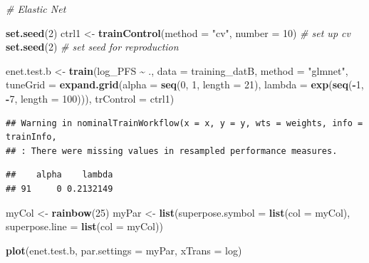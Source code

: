 \documentclass[
]{article}
\newenvironment{Shaded}{\begin{snugshade}}{\end{snugshade}}
\newcommand{\AttributeTok}[1]{\textcolor[rgb]{0.13,0.29,0.53}{#1}}
\newcommand{\CommentTok}[1]{\textcolor[rgb]{0.56,0.35,0.01}{\textit{#1}}}
\newcommand{\DecValTok}[1]{\textcolor[rgb]{0.00,0.00,0.81}{#1}}
\newcommand{\FunctionTok}[1]{\textcolor[rgb]{0.13,0.29,0.53}{\textbf{#1}}}
\newcommand{\NormalTok}[1]{#1}
\newcommand{\OtherTok}[1]{\textcolor[rgb]{0.56,0.35,0.01}{#1}}
\newcommand{\SpecialCharTok}[1]{\textcolor[rgb]{0.81,0.36,0.00}{\textbf{#1}}}
\newcommand{\StringTok}[1]{\textcolor[rgb]{0.31,0.60,0.02}{#1}}
\begin{document}
\begin{Shaded}
\begin{Highlighting}[]
\CommentTok{\# Elastic Net}

\FunctionTok{set.seed}\NormalTok{(}\DecValTok{2}\NormalTok{)}
\NormalTok{ctrl1 }\OtherTok{\textless{}{-}} \FunctionTok{trainControl}\NormalTok{(}\AttributeTok{method =} \StringTok{"cv"}\NormalTok{, }\AttributeTok{number =} \DecValTok{10}\NormalTok{) }\CommentTok{\# set up cv}
\FunctionTok{set.seed}\NormalTok{(}\DecValTok{2}\NormalTok{) }\CommentTok{\# set seed for reproduction}

\NormalTok{enet.test.b }\OtherTok{\textless{}{-}} \FunctionTok{train}\NormalTok{(log\_PFS }\SpecialCharTok{\textasciitilde{}}\NormalTok{ ., }
                  \AttributeTok{data =}\NormalTok{ training\_datB, }
                  \AttributeTok{method =} \StringTok{"glmnet"}\NormalTok{,}
                  \AttributeTok{tuneGrid =} \FunctionTok{expand.grid}\NormalTok{(}\AttributeTok{alpha =} \FunctionTok{seq}\NormalTok{(}\DecValTok{0}\NormalTok{, }\DecValTok{1}\NormalTok{, }\AttributeTok{length =} \DecValTok{21}\NormalTok{),}
                                         \AttributeTok{lambda =} \FunctionTok{exp}\NormalTok{(}\FunctionTok{seq}\NormalTok{(}\SpecialCharTok{{-}}\DecValTok{1}\NormalTok{, }\SpecialCharTok{{-}}\DecValTok{7}\NormalTok{, }\AttributeTok{length =} \DecValTok{100}\NormalTok{))),}
                  \AttributeTok{trControl =}\NormalTok{ ctrl1)}
\end{Highlighting}
\end{Shaded}

\begin{verbatim}
## Warning in nominalTrainWorkflow(x = x, y = y, wts = weights, info = trainInfo,
## : There were missing values in resampled performance measures.
\end{verbatim}

\begin{Shaded}
\end{Shaded}

\begin{verbatim}
##    alpha    lambda
## 91     0 0.2132149
\end{verbatim}

\begin{Shaded}
\begin{Highlighting}[]
\NormalTok{myCol }\OtherTok{\textless{}{-}} \FunctionTok{rainbow}\NormalTok{(}\DecValTok{25}\NormalTok{)}
\NormalTok{myPar }\OtherTok{\textless{}{-}} \FunctionTok{list}\NormalTok{(}\AttributeTok{superpose.symbol =} \FunctionTok{list}\NormalTok{(}\AttributeTok{col =}\NormalTok{ myCol),}
\AttributeTok{superpose.line =} \FunctionTok{list}\NormalTok{(}\AttributeTok{col =}\NormalTok{ myCol))}

\FunctionTok{plot}\NormalTok{(enet.test.b, }\AttributeTok{par.settings =}\NormalTok{ myPar, }\AttributeTok{xTrans =}\NormalTok{ log)}
\end{Highlighting}
\end{Shaded}
\end{document}
